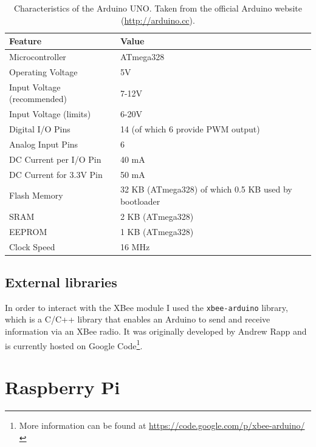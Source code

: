 \begin{table}[ht] 
\centering
\begin{tabular}{l|l}
    Feature     & Value\\
\hline
Microcontroller	& ATmega328\\
Operating Voltage &	5V\\
Input Voltage (recommended) & 7-12V\\
Input Voltage (limits) & 6-20V\\
Digital I/O Pins & 14 (of which 6 provide PWM output)\\
Analog Input Pins & 6\\
DC Current per I/O Pin & 40 mA\\
DC Current for 3.3V Pin & 50 mA\\
Flash Memory & 32 KB (ATmega328) of which 0.5 KB used by bootloader\\
SRAM & 2 KB (ATmega328)\\
EEPROM &	1 KB (ATmega328)\\
Clock Speed &	16 MHz\\
\end{tabular}
\caption[Characteristics of the Arduino UNO]{Characteristics of the Arduino UNO. Taken from the official Arduino website (\url{http://arduino.cc}).}
\label{tab:arduinofeatures}
\end{table}

\subsection{External libraries}
In order to interact with the XBee module I used the \texttt{xbee-arduino} library, which is a C/C++ library that enables an Arduino to send and receive information via an XBee\textregistered{} radio. It was originally developed by Andrew Rapp and is currently hosted on Google Code\footnote{More information can be found at \url{https://code.google.com/p/xbee-arduino/}}.


\section{Raspberry Pi}

